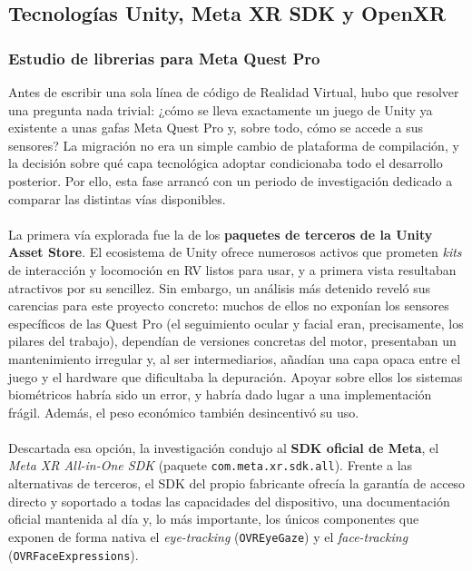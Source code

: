 \documentclass[12pt,twoside,titlepage]{report}
\begin{document}
\subsection{Tecnologías Unity, Meta XR SDK y OpenXR}

\subsubsection{Estudio de librerias para Meta Quest Pro}

Antes de escribir una sola línea de código de Realidad Virtual, hubo que resolver una pregunta nada trivial: ¿cómo se lleva exactamente un juego de Unity ya existente a unas gafas Meta Quest Pro y, sobre todo, cómo se accede a sus sensores?
La migración no era un simple cambio de plataforma de compilación, y la decisión sobre qué capa tecnológica adoptar condicionaba todo el desarrollo posterior.
Por ello, esta fase arrancó con un periodo de investigación dedicado a comparar las distintas vías disponibles.\\
\\
La primera vía explorada fue la de los \textbf{paquetes de terceros de la Unity Asset Store}.
El ecosistema de Unity ofrece numerosos activos que prometen \textit{kits} de interacción y locomoción en RV listos para usar, y a primera vista resultaban atractivos por su sencillez.
Sin embargo, un análisis más detenido reveló sus carencias para este proyecto concreto: muchos de ellos no exponían los sensores específicos de las Quest Pro (el seguimiento ocular y facial eran, precisamente, los pilares del trabajo), dependían de versiones concretas del motor, presentaban un mantenimiento irregular y, al ser intermediarios, añadían una capa opaca entre el juego y el hardware que dificultaba la depuración.
Apoyar sobre ellos los sistemas biométricos habría sido un error, y habría dado lugar a una implementación frágil. Además, el peso económico también desincentivó su uso.\\
\\
Descartada esa opción, la investigación condujo al \textbf{SDK oficial de Meta}, el \textit{Meta XR All-in-One SDK} (paquete \texttt{com.meta.xr.sdk.all}).
Frente a las alternativas de terceros, el SDK del propio fabricante ofrecía la garantía de acceso directo y soportado a todas las capacidades del dispositivo, una documentación oficial mantenida al día y, lo más importante, los únicos componentes que exponen de forma nativa el \textit{eye-tracking} (\texttt{OVREyeGaze}) y el \textit{face-tracking} (\texttt{OVRFaceExpressions}).
\end{document}
